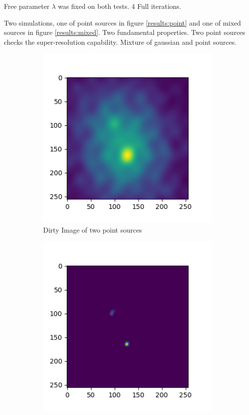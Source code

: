 Free parameter $\lambda$ was fixed on both tests. 4 Full iterations.

Two simulations, one of point sources in figure \ref{results:point} and one of mixed sources in figure \ref{results:mixed}. Two fundamental properties. Two point sources checks the super-resolution capability. Mixture of gaussian and point sources. 

\begin{figure}[h]
	\centering
	\begin{subfigure}[b]{0.45\linewidth}
		\includegraphics[width=\linewidth]{./chapters/05.algorithms/sim02/sim02_point_dirty.png}
		\caption{Dirty Image of two point sources}
		\label{results:point:dirty}
	\end{subfigure}
	\begin{subfigure}[b]{0.45\linewidth}
		\includegraphics[width=\linewidth]{./chapters/05.algorithms/sim02/image4.png}

\end{subfigure}
\end{figure}
